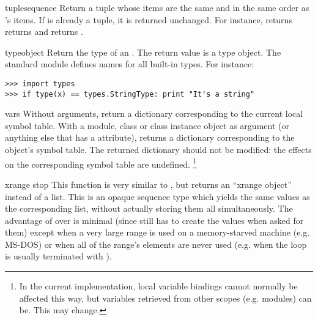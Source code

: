 \begin{funcdesc}{tuple}{sequence}
Return a tuple whose items are the same and in the same order as
's items.  If  is already a tuple, it
is returned unchanged.  For instance,  returns
returns  and  returns
.
\end{funcdesc}

\begin{funcdesc}{type}{object}
Return the type of an .  The return value is a type
object.  The standard module  defines names for all
built-in types.
For instance:

\begin{verbatim}
>>> import types
>>> if type(x) == types.StringType: print "It's a string"
\end{verbatim}
\end{funcdesc}

\begin{funcdesc}{vars}{}
Without arguments, return a dictionary corresponding to the current
local symbol table.  With a module, class or class instance object as
argument (or anything else that has a  attribute),
returns a dictionary corresponding to the object's symbol table.
The returned dictionary should not be modified: the effects on the
corresponding symbol table are undefined.%
\footnote{In the current implementation, local variable bindings
cannot normally be affected this way, but variables retrieved from
other scopes (e.g. modules) can be.  This may change.}
\end{funcdesc}

\begin{funcdesc}{xrange}{ stop}
This function is very similar to , but returns an
``xrange object'' instead of a list.  This is an opaque sequence type
which yields the same values as the corresponding list, without
actually storing them all simultaneously.  The advantage of
 over  is minimal (since
 still has to create the values when asked for
them) except when a very large range is used on a memory-starved
machine (e.g. MS-DOS) or when all of the range's elements are never
used (e.g. when the loop is usually terminated with ).
\end{funcdesc}
